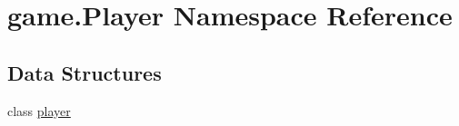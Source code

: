 \hypertarget{namespacegame_1_1_player}{}\section{game.\+Player Namespace Reference}
\label{namespacegame_1_1_player}
\subsection*{Data Structures}
\begin{DoxyCompactItemize}
\item 
class \hyperlink{classgame_1_1_player_1_1player}{player}
\end{DoxyCompactItemize}
